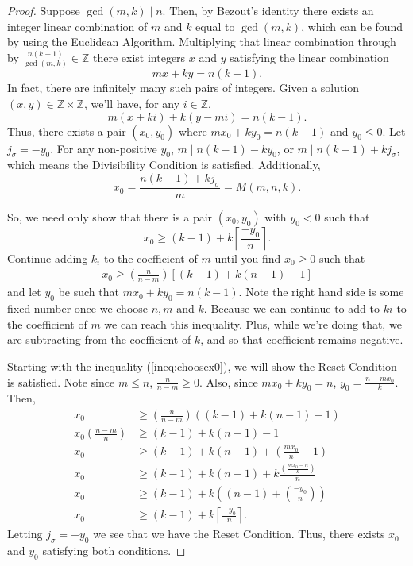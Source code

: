 \documentclass{article}
\theoremstyle{theorem}
\theoremstyle{definition}
\begin{document}
\begin{proof}
    Suppose $\gcd(m,k)\mid n$. Then, by Bezout's identity there exists an integer linear combination of $m$ and $k$ equal to $\gcd(m,k)$, which can be found by using the Euclidean Algorithm. Multiplying that linear combination through by $\frac{n(k-1)}{\gcd(m,k)}\in\mathbb{Z}$ there exist integers $x$ and $y$ satisfying the linear combination
    $$mx+ky = n(k-1).$$
    In fact, there are infinitely many such pairs of integers. Given a solution $(x,y)\in\mathbb{Z}\times \mathbb{Z}$, we'll have, for any $i\in\mathbb{Z}$,
    $$m(x+ki) + k(y-mi) = n(k-1).$$
    Thus, there exists a pair $(x_0, y_0)$ where $mx_0+ky_0 = n(k-1)$ and $y_0\leq 0$. Let $j_\sigma = -y_0$. For any non-positive $y_0$, $m\mid n(k-1)-ky_0$, or $m\mid n(k-1)+ kj_\sigma$, which means the Divisibility Condition is satisfied. Additionally,
    $$x_0 = \frac{n(k-1) +kj_\sigma}{m} = M(m,n,k).$$

    So, we need only show that there is a pair $(x_0,y_0)$ with $y_0<0$ such that 
    $$x_0 \geq (k-1) + k \left\lceil \frac{-y_0}{n}\right\rceil.$$
    Continue adding $k_i$ to the coefficient of $m$ until you find $x_0\geq 0$ such that
        \begin{align}
            x_0 \geq \left( \frac{n}{n-m}\right) [(k-1)+k(n-1)-1] \label{ineq:choosex0}
        \end{align}
    and let $y_0$ be such that $mx_0+ky_0 = n(k-1)$.
    Note the right hand side is some fixed number once we choose $n,m$ and $k$. Because we can continue to add to $ki$ to the coefficient of $m$ we can reach this inequality. Plus, while we're doing that, we are subtracting from the coefficient of $k$, and so that coefficient remains negative.

  Starting with the inequality (\ref{ineq:choosex0}), we will show the Reset Condition is satisfied.   Note since $m\le n$, $\frac{n}{n-m} \geq 0$. Also, since $mx_0+ky_0 = n$, $y_0=\frac{n-mx_0}{k}$. Then,
    \begin{align*}
            x_0 &\geq \left( \frac{n}{n-m}\right) ((k-1)+k(n-1)-1)\\
            x_0 \left(\frac{n-m}{n}\right) &\geq (k-1)+k(n-1)-1\\
            x_0 &\geq (k-1) + k(n-1) +\left(\frac{mx_0}{n} - 1\right)\\
            x_0 &\geq (k-1) + k(n-1) + k \frac{\left(\frac{mx_0-n}{k}\right)}{n}\\
            x_0 &\geq (k-1) + k\left( (n-1) + \left(\frac{-y_0}{n}\right)\right)\\
            x_0 & \geq (k-1) + k \left\lceil \frac{-y_0}{n}\right\rceil.
        \end{align*}
Letting $j_\sigma = -y_0$ we see that we have the Reset Condition. Thus, there exists $x_0$ and $y_0$ satisfying both conditions.
\end{proof}
\end{document}

